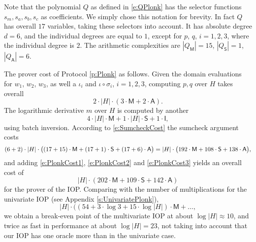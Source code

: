 \documentclass[11pt]{article}
\theoremstyle{definition}
\theoremstyle{remark}
\begin{document}
Note that the polynomial $Q$ as defined in \eqref{e:QPlonk} has the selector functions $s_m, s_a, s_b, s_c$ as coefficients.
We simply chose this notation for brevity. 
In fact $Q$ has overall $17$ variables, taking these selectors into account.
It has absolute degree $d= 6$, and the individual degrees are equal to $1$, except for $p$, $q$, $i=1,2,3$, where the individual degree is $2$.
The arithmetic complexities are $|Q_\mathsf M| = 15$, $|Q_\mathsf S| = 1$, $|Q_\mathsf A |= 6$.

The prover cost of Protocol \ref{p:Plonk} as follows. 
Given the domain evaluations for $w_1$, $w_2$, $w_3$, as well a $\iota_i$ and $\iota\circ\sigma_i$, $i=1,2,3$, 
computing $p, q$ over $H$ takes overall
\begin{equation}
\label{e:PlonkCost1}
 2\cdot |H|\cdot ( 3\cdot\mathsf M + 2\cdot\mathsf A).
\end{equation}
The logarithmic derivative $m$ over $H$ is computed by another 
\begin{equation}
\label{e:PlonkCost2}
4\cdot |H| \cdot\mathsf M + 1\cdot |H|\cdot \mathsf S + 1\cdot\mathsf I,
\end{equation}
using batch inversion.
According to \eqref{e:SumcheckCost} the sumcheck argument costs
\begin{equation}
\label{e:PlonkCost3}
(6 + 2) \cdot |H| \cdot \big((17 + 15) \cdot\textsf M +  (17 + 1) \cdot\textsf S + (17 + 6) \cdot \textsf A\big) 
=  |H| \cdot \big(192 \cdot\textsf M +  108\cdot\textsf S + 138 \cdot \textsf A\big),
\end{equation}
and adding \eqref{e:PlonkCost1}, \eqref{e:PlonkCost2} and \eqref{e:PlonkCost3} yields an overall cost of 
\begin{equation}
|H|\cdot (202\cdot\mathsf M + 109\cdot \mathsf S + 142\cdot \mathsf A)
\end{equation}
for the prover of the IOP.
Comparing with the number of multiplications for the univariate IOP (see Appendix \ref{s:UnivariatePlonk}), 
\begin{equation}
|H| \cdot ((54 + 3\cdot\log 3 + 15\cdot \log|H|)\cdot\mathsf M + \ldots,
\end{equation}
we obtain a break-even point of the multivariate IOP at about $\log |H| \approx 10$, and twice as fast in performance at about $\log|H| = 23$, not taking into account that our IOP has one oracle more than in the univariate case.
\end{document}
